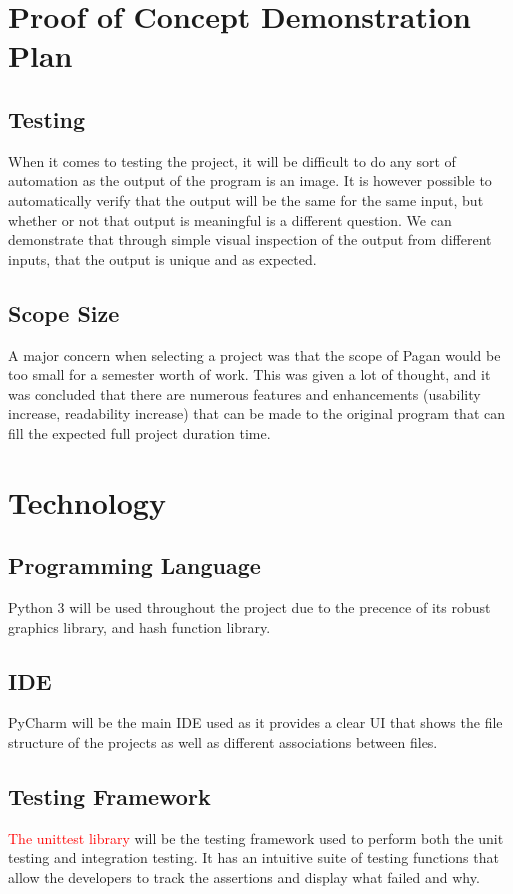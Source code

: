 \documentclass{article}
\begin{document}
\section{Proof of Concept Demonstration Plan}

\subsection{Testing}
When it comes to testing the project, it will be difficult to do any sort of automation as the output of the program is an image. It is however possible to automatically verify that the output will be the same for the same input, but whether or not that output is meaningful is a different question. We can demonstrate that through simple visual inspection of the output from different inputs, that the output is unique and as expected.

\subsection{Scope Size}
A major concern when selecting a project was that the scope of Pagan would be too small for a semester worth of work. This was given a lot of thought, and it was concluded that there are numerous features and enhancements (usability increase, readability increase) that can be made to the original program that can fill the expected full project duration time.

\section{Technology}

\subsection{Programming Language}
Python 3 will be used throughout the project due to the precence of its robust graphics library, and hash function library.
\subsection{IDE}
PyCharm will be the main IDE used as it provides a clear UI that shows the file structure of the projects as well as different associations between files.
\subsection{Testing Framework}
\textcolor{red}{The unittest library} will be the testing framework used to perform both the unit testing and integration testing. It has an intuitive suite of testing functions that allow the developers to track the assertions and display what failed and why.
\end{document}
